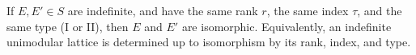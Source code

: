 If $E, E' \in S$ are indefinite, and have the same rank $r$, the same index $\tau$, and the same type (I or II), then $E$ and $E'$ are isomorphic. Equivalently, an indefinite unimodular lattice is determined up to isomorphism by its rank, index, and type.
